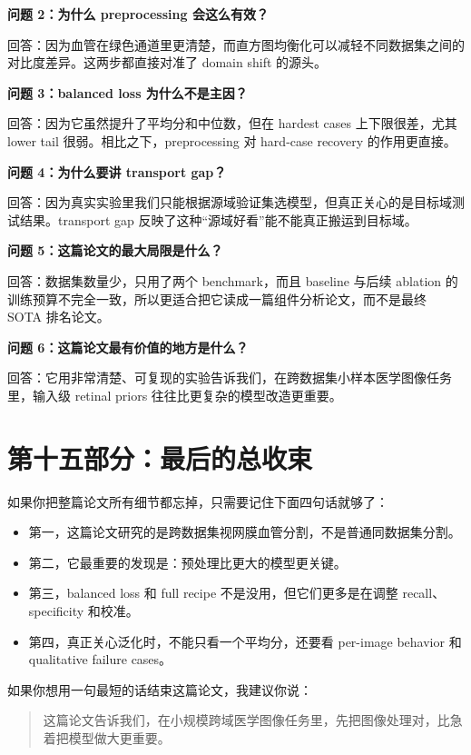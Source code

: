 \documentclass[12pt,a4paper]{ctexart}
\begin{document}
\textbf{问题 2：为什么 preprocessing 会这么有效？}

回答：因为血管在绿色通道里更清楚，而直方图均衡化可以减轻不同数据集之间的对比度差异。这两步都直接对准了 domain shift 的源头。

\textbf{问题 3：balanced loss 为什么不是主因？}

回答：因为它虽然提升了平均分和中位数，但在 hardest cases 上下限很差，尤其 lower tail 很弱。相比之下，preprocessing 对 hard-case recovery 的作用更直接。

\textbf{问题 4：为什么要讲 transport gap？}

回答：因为真实实验里我们只能根据源域验证集选模型，但真正关心的是目标域测试结果。transport gap 反映了这种“源域好看”能不能真正搬运到目标域。

\textbf{问题 5：这篇论文的最大局限是什么？}

回答：数据集数量少，只用了两个 benchmark，而且 baseline 与后续 ablation 的训练预算不完全一致，所以更适合把它读成一篇组件分析论文，而不是最终 SOTA 排名论文。

\textbf{问题 6：这篇论文最有价值的地方是什么？}

回答：它用非常清楚、可复现的实验告诉我们，在跨数据集小样本医学图像任务里，输入级 retinal priors 往往比更复杂的模型改造更重要。

\section*{第十五部分：最后的总收束}

如果你把整篇论文所有细节都忘掉，只需要记住下面四句话就够了：

\begin{itemize}[leftmargin=1.6em]
  \item 第一，这篇论文研究的是跨数据集视网膜血管分割，不是普通同数据集分割。
  \item 第二，它最重要的发现是：预处理比更大的模型更关键。
  \item 第三，balanced loss 和 full recipe 不是没用，但它们更多是在调整 recall、specificity 和校准。
  \item 第四，真正关心泛化时，不能只看一个平均分，还要看 per-image behavior 和 qualitative failure cases。
\end{itemize}

如果你想用一句最短的话结束这篇论文，我建议你说：

\begin{quote}
这篇论文告诉我们，在小规模跨域医学图像任务里，先把图像处理对，比急着把模型做大更重要。
\end{quote}
\end{document}
